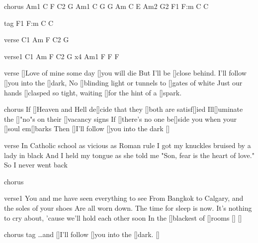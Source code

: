 
\chords chorus {
  Am1 C F C2 G
  Am1 C G G
  Am C E Am2 G2
  F1 F:m C C
}

\chords tag {
  F1 F:m C C
}

\chords verse {
  C1 Am F C2 G
}

\chords verse1 {
  C1 Am F C2 G x4
  Am1 F F F
}

\lyrics verse {
  []Love of mine some day []you will die
  But I'll be []close behind. I'll follow []you into the []dark,
  No []blinding light or tunnels to []gates of white
  Just our hands []clasped so tight, waiting []for the hint of a []spark.
}

\lyrics chorus {
  If []Heaven and Hell de[]cide that they []both are satisf[]ied
  Ill[]uminate the []"no"s on their []vacancy signs
  If []there's no one be[]side you when your []soul em[]barks
  Then []I'll follow []you into the dark []
}

\lyrics verse {
  In Catholic school as vicious as Roman rule
  I got my knuckles bruised by a lady in black
  And I held my tongue as she told me
  "Son, fear is the heart of love." So I never went back
}

\comment chorus

\lyrics verse1{
  You and me have seen everything to see
  From Bangkok to Calgary, and the soles of your shoes 
  Are all worn down. The time for sleep is now.
  It's nothing to cry about, 'cause we'll hold each other soon
  In the []blackest of []rooms [] []
}

\comment chorus
\lyrics tag {
  …and []I’ll follow []you into the []dark. []
}
